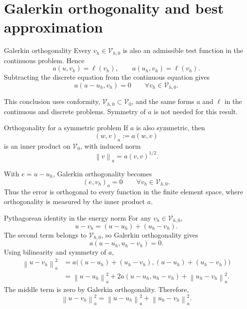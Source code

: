\documentclass[11pt,aspectratio=169]{beamer}
\newcommand{\Vzero}{\mathcal V_0}
\newcommand{\Vhzero}{\mathcal V_{h,0}}
\newcommand{\norm}[2][]{\left\lVert#2\right\rVert_{#1}}
\begin{document}
\section{Galerkin orthogonality and best approximation}

\begin{frame}{Galerkin orthogonality}
Every $v_h\in\Vhzero$ is also an admissible test function in the continuous
problem. Hence
\[
  a(u,v_h)=\ell(v_h),
  \qquad
  a(u_h,v_h)=\ell(v_h).
\]
Subtracting the discrete equation from the continuous equation gives
\[
  \boxed{
  a(u-u_h,v_h)=0
  \qquad\forall v_h\in\Vhzero.}
\]

This conclusion uses conformity, $\Vhzero\subset\Vzero$, and the same forms
$a$ and $\ell$ in the continuous and discrete problems. Symmetry of $a$ is
not needed for this result.
\end{frame}

\begin{frame}{Orthogonality for a symmetric problem}
If $a$ is also symmetric, then
\[
  (w,v)_a:=a(w,v)
\]
is an inner product on $\Vzero$, with induced norm
\[
  \norm[a]{v}=a(v,v)^{1/2}.
\]

With $e=u-u_h$, Galerkin orthogonality becomes
\[
  (e,v_h)_a=0
  \qquad\forall v_h\in\Vhzero.
\]
Thus the error is orthogonal to every function in the finite element space,
where orthogonality is measured by the inner product $a$.
\end{frame}

\begin{frame}{Pythagorean identity in the energy norm}
For any $v_h\in\Vhzero$,
\[
  u-v_h=(u-u_h)+(u_h-v_h).
\]
The second term belongs to $\Vhzero$, so Galerkin orthogonality gives
\[
  a(u-u_h,u_h-v_h)=0.
\]
Using bilinearity and symmetry of $a$,
\begin{align*}
  \norm[a]{u-v_h}^2
  &=a\bigl((u-u_h)+(u_h-v_h),(u-u_h)+(u_h-v_h)\bigr)\\
  &=\norm[a]{u-u_h}^2
    +2a(u-u_h,u_h-v_h)
    +\norm[a]{u_h-v_h}^2.
\end{align*}
The middle term is zero by Galerkin orthogonality. Therefore,
\[
  \boxed{
  \norm[a]{u-v_h}^2
  =\norm[a]{u-u_h}^2+\norm[a]{u_h-v_h}^2.}
\]
\end{frame}
\end{document}
